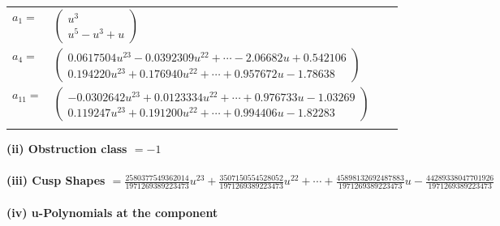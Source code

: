 \documentclass[1p]{elsarticle_modified}
\theoremstyle{definition}
\begin{document}
\begin{tabular}{m{7pt} m{180pt} m{7pt} m{180pt} }
\flushright $a_{1}=$&$\begin{pmatrix}u^3\\u^5- u^3+u\end{pmatrix}$ \\
\flushright $a_{4}=$&$\begin{pmatrix}0.0617504 u^{23}-0.0392309 u^{22}+\cdots-2.06682 u+0.542106\\0.194220 u^{23}+0.176940 u^{22}+\cdots+0.957672 u-1.78638\end{pmatrix}$ \\
\flushright $a_{11}=$&$\begin{pmatrix}-0.0302642 u^{23}+0.0123334 u^{22}+\cdots+0.976733 u-1.03269\\0.119247 u^{23}+0.191200 u^{22}+\cdots+0.994406 u-1.82283\end{pmatrix}$\\&\end{tabular}
\flushleft \textbf{(ii) Obstruction class $= -1$}\\~\\
\flushleft \textbf{(iii) Cusp Shapes $= \frac{2580377549362014}{1971269389223473} u^{23}+\frac{3507150554528052}{1971269389223473} u^{22}+\cdots+\frac{45898132692487883}{1971269389223473} u-\frac{44289338047701926}{1971269389223473}$}\\~\\
\newpage\renewcommand{\arraystretch}{1}
\flushleft \textbf{(iv) u-Polynomials at the component}\newline \\
\end{document}
